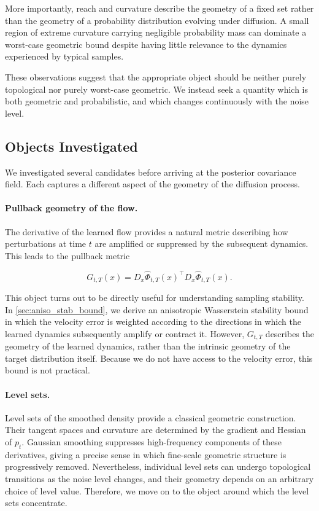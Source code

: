 \documentclass{article}
\theoremstyle{plain}
\theoremstyle{definition}
\theoremstyle{remark}
\begin{document}
More importantly, reach and curvature describe the geometry of a fixed set rather than the geometry of a probability distribution evolving under diffusion. A small region of extreme curvature carrying negligible probability mass can dominate a worst-case geometric bound despite having little relevance to the dynamics experienced by typical samples.

These observations suggest that the appropriate object should be neither purely topological nor purely worst-case geometric. We instead seek a quantity which is both geometric and probabilistic, and which changes continuously with the noise level.

\subsection{Objects Investigated}
\label{subsec:objects-investigated}

We investigated several candidates before arriving at the posterior covariance field. Each captures a different aspect of the geometry of the diffusion process.

\paragraph{Pullback geometry of the flow.}
The derivative of the learned flow provides a natural metric describing how perturbations at time $t$ are amplified or suppressed by the subsequent dynamics. This leads to the pullback metric

$$
    G_{t,T}(x)
    =
    D_x\hat{\Phi}_{t,T}(x)^\top
    D_x\hat{\Phi}_{t,T}(x).
$$

This object turns out to be directly useful for understanding sampling stability. In \autoref{sec:aniso_stab_bound}, we derive an anisotropic Wasserstein stability bound in which the velocity error is weighted according to the directions in which the learned dynamics subsequently amplify or contract it. However, $G_{t,T}$ describes the geometry of the learned dynamics, rather than the intrinsic geometry of the target distribution itself. Because we do not have access to the velocity error, this bound is not practical.

\paragraph{Level sets.}
Level sets of the smoothed density provide a classical geometric construction. Their tangent spaces and curvature are determined by the gradient and Hessian of $p_t$. Gaussian smoothing suppresses high-frequency components of these derivatives, giving a precise sense in which fine-scale geometric structure is progressively removed. Nevertheless, individual level sets can undergo topological transitions as the noise level changes, and their geometry depends on an arbitrary choice of level value. Therefore, we move on to the object around which the level sets concentrate.
\end{document}
